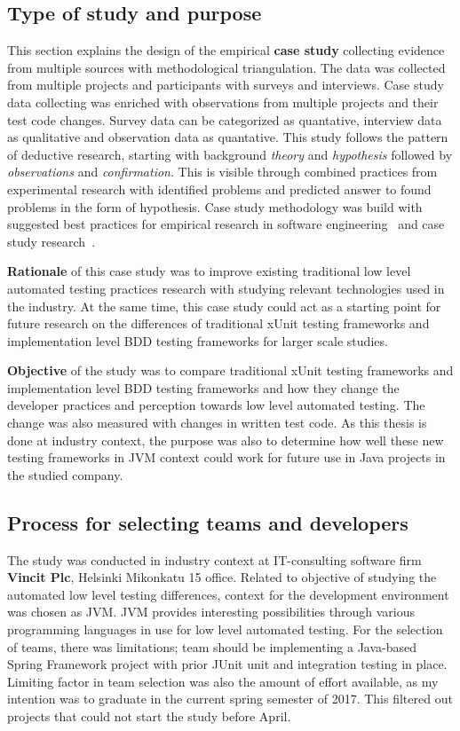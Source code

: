 \subsection{Type of study and purpose}
    This section explains the design of the empirical \textbf{case study} collecting evidence from multiple sources with methodological triangulation.
    The data was collected from multiple projects and participants with surveys and interviews.
    Case study data collecting was enriched with observations from
    multiple projects and their test code changes. Survey data can be categorized as quantative, interview data as qualitative and observation data as quantative.
    This study follows the pattern of deductive research, starting with background \textit{theory} and \textit{hypothesis} followed by
    \textit{observations} and \textit{confirmation}. This is visible through combined practices
    from experimental research with identified problems and predicted answer to found problems in the form of hypothesis.
    Case study methodology was build with suggested best practices for empirical research in software engineering~\cite{kitchenham2002preliminary} and case
    study research~\cite{runeson2012case}.

    \textbf{Rationale} of this case study was to improve existing traditional low level automated testing practices research with studying
    relevant technologies used in the industry. At the same time, this case study could act as a starting point for future
    research on the differences of traditional xUnit testing frameworks and implementation level BDD testing frameworks for larger
    scale studies.

    \textbf{Objective} of the study was to compare traditional xUnit testing frameworks and implementation level BDD testing frameworks
    and how they change the developer practices and perception towards low level automated testing. The change was also measured
    with changes in written test code.
    As this thesis is done at industry context, the purpose was also to determine how well these
    new testing frameworks in JVM context could work for future use in Java projects in the studied company.


\subsection{Process for selecting teams and developers}
    The study was conducted in industry context at IT-consulting software firm \textbf{Vincit Plc}, Helsinki Mikonkatu 15 office.
    Related to objective of studying the automated low level testing differences, context for the development environment was chosen as JVM.
    JVM provides interesting possibilities through various programming languages in use for low level automated testing.
    For the selection of teams, there was limitations; team should be implementing a Java-based Spring Framework project with prior JUnit
    unit and integration testing in place. Limiting factor in team selection was also the amount of effort available,
    as my intention was to graduate in the current spring semester of 2017.  This filtered out projects that could not start
    the study before April.

